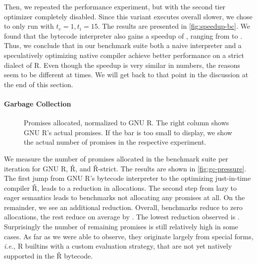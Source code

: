 \documentclass[review,creen,acmsmall]{acmart}
\renewcommand{\Rsh}{{\sf\v R}\xspace}
\newcommand{\ie}{\emph{i.e.},\xspace}
\begin{document}
Then, we repeated the performance experiment, but with the second tier
optimizer completely disabled. Since this variant executes overall \rshBCSlowdown
slower, we chose to only run with $t_e = 1, t_i = 15$.
The results are presented in \autoref{fig:speedup-bc}. We found that the bytecode
interpreter also gains a speedup of \speedupBCRshStrict, ranging from
\speedupBCRshStrictMin to \speedupBCRshStrictMax.
%
Thus, we conclude that in our benchmark suite both a naive interpreter and a speculatively
optimizing native compiler achieve better performance on a strict dialect of R.
Even though the speedup is very similar in numbers, the reasons seem to be
different at times. We will get back to that point in the discussion at the end of
this section.

\paragraph{Garbage Collection}

\begin{figure}[h]
  \centering
  
  \caption{Promises allocated, normalized to GNU R. The right column shows GNU R's actual promises. If the bar is too small to display, we show the actual number of promises in the respective experiment.}
  \label{fig:gc-pressure}
\end{figure}

We measure the number of promises allocated in the
benchmark suite per iteration for GNU R, \Rsh, and \Rsh-strict. The results are shown in
\autoref{fig:gc-pressure}. The first jump from GNU R's bytecode interpreter to
the optimizing just-in-time compiler \Rsh, leads to a \promiseAlocationReductionGnurRsh
reduction in allocations. The second step
from lazy to eager semantics leads to \promiseAlocationReductionRshStrictToZero
benchmarks not allocating any promises at all. On the remainder, we see an additional
\promiseAlocationReductionRshStrict reduction.
Overall, \promiseAlocationReductionRshStrictToZero benchmarks reduce to zero
allocations, the rest reduce on average by \promiseAlocationReductionGnurRshStrict.
The lowest reduction observed is
\promiseAlocationReductionGnurRshStrictMin.
Surprisingly the number of remaining promises is
still relatively high in some cases. As far as we were able to observe, they
originate largely from special forms, \ie R builtins with a custom evaluation
strategy, that are not yet natively supported in the \Rsh bytecode.
\end{document}
